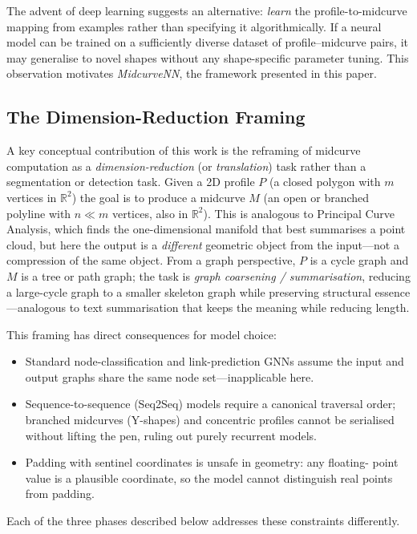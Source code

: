 \documentclass[journal]{IEEEtran}
\begin{document}
The advent of deep learning suggests an alternative: \emph{learn} the
profile-to-midcurve mapping from examples rather than specifying it
algorithmically.  If a neural model can be trained on a sufficiently diverse
dataset of profile--midcurve pairs, it may generalise to novel shapes without
any shape-specific parameter tuning.  This observation motivates
\textit{MidcurveNN}, the framework presented in this paper.

\subsection*{The Dimension-Reduction Framing}

A key conceptual contribution of this work is the reframing of midcurve
computation as a \emph{dimension-reduction} (or \emph{translation}) task rather
than a segmentation or detection task.  Given a 2D profile $P$ (a closed
polygon with $m$ vertices in $\mathbb{R}^2$) the goal is to produce a midcurve
$M$ (an open or branched polyline with $n \ll m$ vertices, also in
$\mathbb{R}^2$).  This is analogous to Principal Curve Analysis, which finds
the one-dimensional manifold that best summarises a point cloud, but here the
output is a \emph{different} geometric object from the input—not a compression
of the same object.  From a graph perspective, $P$ is a cycle graph and $M$ is
a tree or path graph; the task is \emph{graph coarsening / summarisation},
reducing a large-cycle graph to a smaller skeleton graph while preserving
structural essence—analogous to text summarisation that keeps the meaning while
reducing length.

This framing has direct consequences for model choice:
\begin{itemize}
  \item Standard node-classification and link-prediction GNNs assume the input
        and output graphs share the same node set—inapplicable here.
  \item Sequence-to-sequence (Seq2Seq) models require a canonical traversal
        order; branched midcurves (Y-shapes) and concentric profiles cannot be
        serialised without lifting the pen, ruling out purely recurrent models.
  \item Padding with sentinel coordinates is unsafe in geometry: any floating-
        point value is a plausible coordinate, so the model cannot distinguish
        real points from padding.
\end{itemize}
Each of the three phases described below addresses these constraints
differently.
\end{document}
